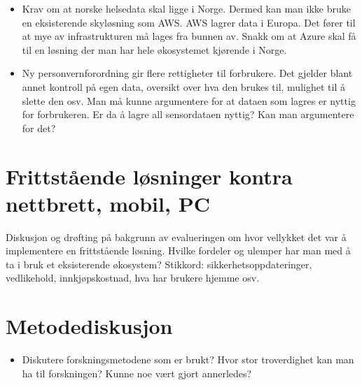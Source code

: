 \begin{itemize}
\tightlist
\item
  Krav om at norske helsedata skal ligge i Norge. Dermed kan man ikke
  bruke en eksisterende skyløsning som AWS. AWS lagrer data i Europa.
  Det fører til at mye av infrastrukturen må lages fra bunnen av. Snakk
  om at Azure skal få til en løsning der man har hele økosystemet
  kjørende i Norge.
\item
  Ny personvernforordning gir flere rettigheter til forbrukere. Det
  gjelder blant annet kontroll på egen data, oversikt over hva den
  brukes til, mulighet til å slette den osv. Man må kunne argumentere
  for at dataen som lagres er nyttig for forbrukeren. Er da å lagre all
  sensordataen nyttig? Kan man argumentere for det?
\end{itemize}

\section{Frittstående løsninger kontra nettbrett, mobil,
PC}\label{frittstuxe5ende-luxf8sninger-kontra-nettbrett-mobil-pc}

Diskusjon og drøfting på bakgrunn av evalueringen om hvor vellykket det
var å implementere en frittstående løsning. Hvilke fordeler og ulemper
har man med å ta i bruk et eksisterende økosystem? Stikkord:
sikkerhetsoppdateringer, vedlikehold, innkjøpskostnad, hva har brukere
hjemme osv.

\section{Metodediskusjon}\label{metodediskusjon}

\begin{itemize}
\tightlist
\item
  Diskutere forskningsmetodene som er brukt? Hvor stor troverdighet kan
  man ha til forskningen? Kunne noe vært gjort annerledes?
\end{itemize}
\fi
